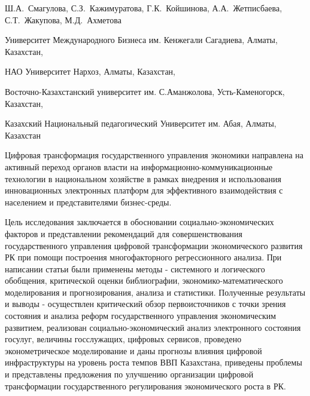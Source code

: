 
\begin{header}

Ш.А.~Смагулова,
С.З.~Кажимуратова\envelope,
Г.К.~Койшинова,
А.А.~Жетписбаева,
С.Т.~Жакупова,
М.Д.~Ахметова
\end{header}

\begin{affil}
Университет Международного Бизнеса им. Кенжегали Сагадиева, Алматы, Казахстан,

НАО Университет Нархоз, Алматы, Казахстан,

Восточно-Казахстанский университет им. С.Аманжолова, Усть-Каменогорск, Казахстан,

Казахский Национальный педагогический Университет им. Абая, Алматы, Казахстан

\end{affil}

Цифровая трансформация государственного управления экономики направлена
на активный переход органов власти на информационно-коммуникационные
технологии в национальном хозяйстве в рамках внедрения и использования
инновационных электронных платформ для эффективного взаимодействия с
населением и представителями бизнес-среды.

Цель исследования заключается в обосновании социально-экономических
факторов и представлении рекомендаций для совершенствования
государственного управления цифровой трансформации экономического
развития РК при помощи построения многофакторного регрессионного
анализа. При написании статьи были применены методы - системного и
логического обобщения, критической оценки библиографии,
экономико-математического моделирования и прогнозирования, анализа и
статистики. Полученные результаты и выводы - осуществлен критический
обзор первоисточников с точки зрения состояния и анализа реформ
государственного управления экономическим развитием, реализован
социально-экономический анализ электронного состояния госулуг, величины
госслужащих, цифровых сервисов, проведено эконометрическое моделирование
и даны прогнозы влияния цифровой инфраструктуры на уровень роста темпов
ВВП Казахстана, приведены проблемы и представлены предложения по
улучшению организации цифровой трансформации государственного
регулирования экономического роста в РК.

